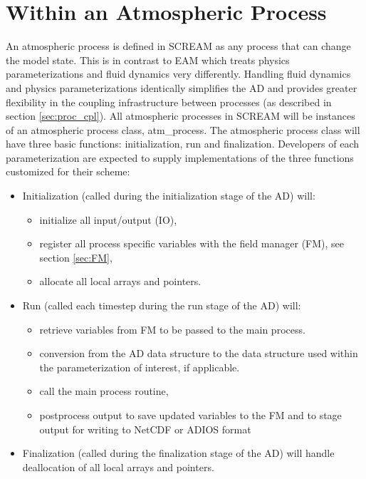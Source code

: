 \documentclass[10pt]{article}
\begin{document}
\section{Within an Atmospheric Process}
\label{sec:atmproc}
An atmospheric process is defined in SCREAM as any process that can change the model state.  This is in contrast to EAM which treats physics parameterizations and fluid dynamics very differently.  Handling fluid dynamics and physics parameterizations identically simplifies the AD and provides greater flexibility in the coupling infrastructure between processes (as described in section \ref{sec:proc_cpl}).  All atmospheric processes in SCREAM will be instances of an atmospheric process class, atm\_process.  The atmospheric process class will have three basic functions: initialization, run and finalization.  Developers of each parameterization are expected to supply implementations of the three functions customized for their scheme: 
\begin{itemize}
\item Initialization (called during the initialization stage of the AD) will:
	\begin{itemize}
	\item initialize all input/output (IO),
	\item register all process specific variables with the field manager (FM), see section \ref{sec:FM},
	\item allocate all local arrays and pointers. 
	\end{itemize}
\item Run (called each timestep during the run stage of the AD) will:
	\begin{itemize}
	\item retrieve variables from FM to be passed to the main process.
	\item conversion from the AD data structure to the data structure used within the parameterization of interest, if applicable.
	\item call the main process routine,
	\item postprocess output to save updated variables to the FM and to stage output for writing to NetCDF or ADIOS format
	\end{itemize}
\item Finalization (called during the finalization stage of the AD) will handle deallocation of all local arrays and pointers.
\end{itemize}
\end{document}
